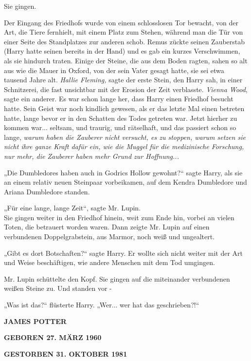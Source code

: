 {Sie gingen.

Der Eingang des Friedhofs wurde von einem schlosslosen Tor bewacht, von der Art, die Tiere fernhielt, mit einem Platz zum Stehen, während man die Tür von einer Seite des Standplatzes zur anderen schob. Remus zückte seinen Zauberstab (Harry hatte seinen bereits in der Hand) und es gab ein kurzes Verschwimmen, als sie hindurch traten. Einige der Steine, die aus dem Boden ragten, sahen so alt aus wie die Mauer in Oxford, von der sein Vater gesagt hatte, sie sei etwa tausend Jahre alt. \emph{Hallie Fleming,} sagte der erste Stein, den Harry sah, in einer Schnitzerei, die fast unsichtbar mit der Erosion der Zeit verblasste. \emph{Vienna Wood}, sagte ein anderer. Es war schon lange her, dass Harry einen Friedhof besucht hatte. Sein Geist war noch kindlich gewesen, als er das letzte Mal einen betreten hatte, lange bevor er in den Schatten des Todes getreten war. Jetzt hierher zu kommen war... seltsam, und traurig, und rätselhaft, und das passiert schon so lange, \emph{warum haben die Zauberer nicht versucht, es zu stoppen, warum setzen sie nicht ihre ganze Kraft dafür ein, wie die Muggel für die medizinische Forschung, nur mehr, die Zauberer haben mehr Grund zur Hoffnung...}

„Die Dumbledores haben auch in Godrics Hollow gewohnt?“ sagte Harry, als sie an einem relativ neuen Steinpaar vorbeikamen, auf dem Kendra Dumbledore und Ariana Dumbledore standen.

„Für eine lange, lange Zeit“, sagte Mr. Lupin.\\ Sie gingen weiter in den Friedhof hinein, weit zum Ende hin, vorbei an vielen Toten, die betrauert worden waren. Dann zeigte Mr. Lupin auf einen verbundenen Doppelgrabstein, aus Marmor, noch weiß und ungealtert.

„Gibt es dort Botschaften?“ sagte Harry. Er wollte sich nicht weiter mit der Art und Weise beschäftigen, wie andere Menschen mit dem Tod umgingen.

Mr. Lupin schüttelte den Kopf. Sie gingen auf die miteinander verbundenen weißen Steine zu. Und standen vor -

„Was ist das?“ flüsterte Harry. „Wer... wer hat das geschrieben?!“

\textbf{JAMES POTTER}

\hfill\break

\textbf{GEBOREN 27. MÄRZ 1960}

\hfill\break

\textbf{GESTORBEN 31. OKTOBER 1981}

}
